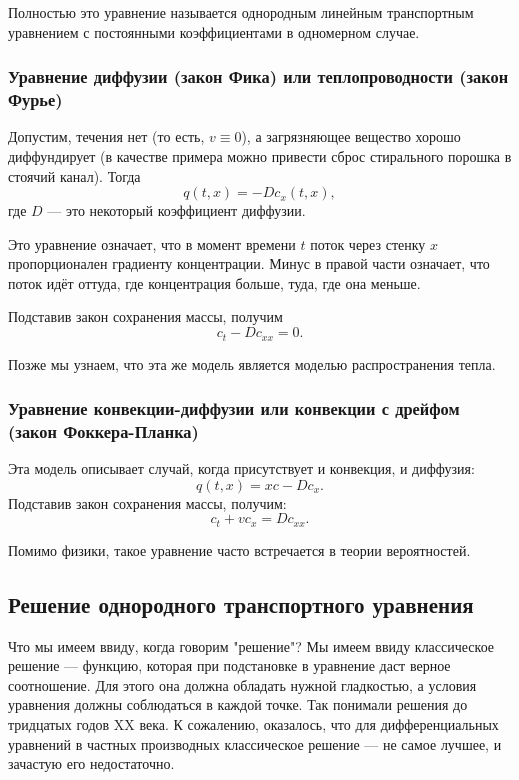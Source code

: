 Полностью это уравнение называется однородным линейным транспортным уравнением с постоянными коэффициентами в одномерном случае.

\subsubsection*{Уравнение диффузии (закон Фика) или теплопроводности (закон Фурье)}

Допустим, течения нет (то есть, $ v \equiv 0 $), а загрязняющее вещество хорошо диффундирует (в качестве примера можно привести сброс стирального порошка в стоячий канал). Тогда
$$q (t, x) = - D c_x (t, x),$$
где $D$ --- это некоторый коэффициент диффузии.

Это уравнение означает, что в момент времени $t$ поток через стенку $x$ пропорционален градиенту концентрации. Минус в правой части означает, что поток идёт оттуда, где концентрация больше, туда, где она меньше.

Подставив закон сохранения массы, получим
\begin{equation}
    c_t - Dc_{xx} = 0.
\end{equation}

Позже мы узнаем, что эта же модель является моделью распространения тепла.

\subsubsection*{Уравнение конвекции-диффузии или конвекции с дрейфом (закон Фоккера-Планка)}
Эта модель описывает случай, когда присутствует и конвекция, и диффузия:
$$ q (t, x)  = x c - D c_x. $$
Подставив закон сохранения массы, получим:
\begin{equation}
    c_t + vc_x = D c_{xx}.
\end{equation}

Помимо физики, такое уравнение часто встречается в теории вероятностей.

\subsection{Решение однородного транспортного уравнения}
Что мы имеем ввиду, когда говорим "решение"? Мы имеем ввиду классическое решение --- функцию, которая при подстановке в уравнение даст верное соотношение. Для этого она должна обладать нужной гладкостью, а условия уравнения должны соблюдаться в каждой точке. Так понимали решения до тридцатых годов XX века. К сожалению, оказалось, что для дифференциальных уравнений в частных производных классическое решение --- не самое лучшее, и зачастую его недостаточно.

